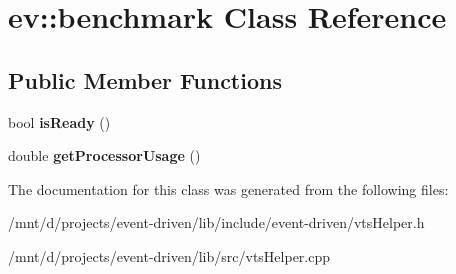 \hypertarget{classev_1_1benchmark}{}\section{ev\+:\+:benchmark Class Reference}
\label{classev_1_1benchmark}
\subsection*{Public Member Functions}
\begin{DoxyCompactItemize}
\item 
\mbox{\label{classev_1_1benchmark_a10722bcfcf5df8e34fc2f17e0247290f}} 
bool {\bfseries is\+Ready} ()
\item 
\mbox{\label{classev_1_1benchmark_a23509b8f8895bafdb36e8bccfc14f82b}} 
double {\bfseries get\+Processor\+Usage} ()
\end{DoxyCompactItemize}


The documentation for this class was generated from the following files\+:\begin{DoxyCompactItemize}
\item 
/mnt/d/projects/event-\/driven/lib/include/event-\/driven/vts\+Helper.\+h\item 
/mnt/d/projects/event-\/driven/lib/src/vts\+Helper.\+cpp\end{DoxyCompactItemize}
